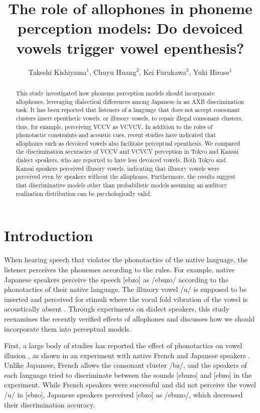 \documentclass[a4paper,11pt,twocolumn]{article}
\title{The role of allophones in phoneme perception models: Do devoiced vowels trigger vowel epenthesis?}
\author{
    Takeshi Kishiyama$^1$,
    Chuyu Huang$^2$,
    Kei Furukawa$^3$,
    Yuki Hirose$^1$}
\begin{document}
\maketitle

\begin{abstract}
This study investigated how phoneme perception models should incorporate allophones, leveraging dialectical differences among Japanese in an AXB discrimination task. It has been reported that listeners of a language that does not accept consonant clusters insert epenthetic vowels, or illusory vowels, to repair illegal consonant clusters, thus, for example, perceiving VCCV as VCVCV. In addition to the roles of phonotactic constraints and acoustic cues, recent studies have indicated that allophones such as devoiced vowels also facilitate perceptual epenthesis. We compared the discrimination accuracies of VCCV and VCVCV perception in Tokyo and Kansai dialect speakers, who are reported to have less devoiced vowels. Both Tokyo and Kansai speakers perceived illusory vowels, indicating that illusory vowels were perceived even by speakers without the allophones. Furthermore, the results suggest that discriminative models other than probabilistic models assuming an auditory realization distribution can be psychologically valid.
\end{abstract}


\section{Introduction}

When hearing speech that violates the phonotactics of the native language, the listener perceives the phonemes according to the rules. For example, native Japanese speakers perceive the speech [ebzo] as /ebuzo/ according to the phonotactics of their native language. The illusory vowel /u/ is supposed to be inserted and perceived for stimuli where the vocal fold vibration of the vowel is acoustically absent \cite{dupoux1999epentheticvi, dupoux2011illusory}. Through experiments on dialect speakers, this study reexamines the recently verified effects of allophones and discusses how we should incorporate them into perceptual models.

First, a large body of studies has reported the effect of phonotactics on vowel illusion \cite{dupoux1999epentheticvi, halle2014special, monahan2009not, mattingley2015influence, guevara2017predicting, guevara2017epenthetic}, as shown in an experiment with native French and Japanese speakers \cite{dupoux1999epentheticvi}. Unlike Japanese, French allows the consonant cluster /bz/, and the speakers of each language tried to discriminate between the sounds [ebuzo] and [ebzo] in the experiment. While French speakers were successful and did not perceive the vowel /u/ in [ebzo], Japanese speakers perceived [ebzo] as /ebuzo/, which decreased their discrimination accuracy.
\end{document}
